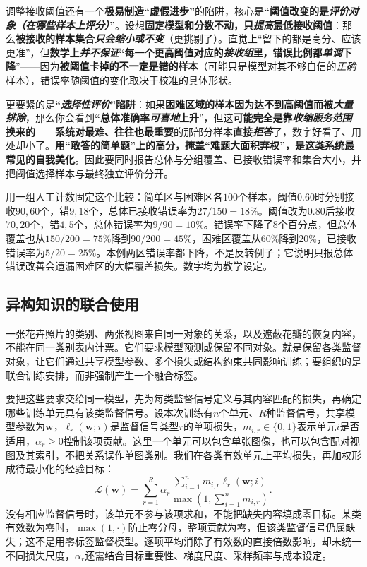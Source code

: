 调整接收阈值还有一个\textbf{极易制造“虚假进步”}的陷阱，核心是\textbf{“阈值改变的是\emph{评价对象（在哪些样本上评分）}”}。设想\textbf{固定模型和分数不动，只\emph{提高}最低接收阈值}：那么\textbf{被接收的样本集合\emph{只会缩小或不变}}（更挑剔了）。直觉上“留下的都是高分、应该更准”，但\textbf{数学上\emph{并不保证}“每一个更高阈值对应的\emph{接收组}里，错误比例都\emph{单调}下降}”——因为\textbf{被阈值卡掉的不一定是错的样本}（可能只是模型对其不够自信的\emph{正确}样本），错误率随阈值的变化取决于校准的具体形状。

更要紧的是\textbf{“\emph{选择性评价}”陷阱}：如果\textbf{困难区域的样本因为达不到高阈值而被\emph{大量排除}}，那么你会看到\textbf{“总体准确率\emph{可喜地}上升}”，但这\textbf{可能完全是靠\emph{收缩服务范围}换来的}——\textbf{系统对最难、往往也最重要}的那部分样本\textbf{直接\emph{拒答}}了，数字好看了、用处却小了。\textbf{用“敢答的简单题”上的高分，掩盖“难题大面积弃权”，是这类系统最常见的自我美化}。因此要同时报告总体与分组覆盖、已接收错误率和集合大小，并把阈值选择样本与最终独立评价分开。

用一组人工计数固定这个比较：简单区与困难区各$100$个样本，阈值$0.60$时分别接收$90,60$个，错$9,18$个，总体已接收错误率为$27/150=18\%$。阈值改为$0.80$后接收$70,20$个，错$4,5$个，总体错误率为$9/90=10\%$。错误率下降了$8$个百分点，但总体覆盖也从$150/200=75\%$降到$90/200=45\%$，困难区覆盖从$60\%$降到$20\%$，已接收错误率为$5/20=25\%$。本例两区错误率都下降，不是反转例子；它说明只报总体错误改善会遗漏困难区的大幅覆盖损失。数字均为教学设定。

\subsection{异构知识的联合使用}
\label{sec:knowledge-fusion-heterogeneous-use}

一张花卉照片的类别、两张视图来自同一对象的关系，以及遮蔽花瓣的恢复内容，不能在同一类别表内计票。它们要求模型预测或保留不同对象。就是保留各类监督对象，让它们通过共享模型参数、多个损失或结构约束共同影响训练；要组织的是联合训练安排，而非强制产生一个融合标签。

要把这些要求交给同一模型，先为每类监督信号定义与其内容匹配的损失，再确定哪些训练单元具有该类监督信号。设本次训练有$n$个单元、$R$种监督信号，共享模型参数为$\bm{w}$，$\ell_r(\bm{w};i)$是监督信号类型$r$的单项损失，$m_{i,r}\in\{0,1\}$表示单元$i$是否适用，$\alpha_r\geq0$控制该项贡献。这里一个单元可以包含单张图像，也可以包含配对视图及其索引，不把关系误作单图类别。我们在各类有效单元上平均损失，再加权形成待最小化的经验目标：
\begin{equation}
  \mathcal{L}(\bm{w})
  =
  \sum_{r=1}^{R}
  \alpha_r
  \frac{\sum_{i=1}^{n}m_{i,r}\ell_r(\bm{w};i)}
  {\max\left(1,\sum_{i=1}^{n}m_{i,r}\right)}.
  \label{eq:knowledge-fusion-heterogeneous-objective}
\end{equation}
没有相应监督信号时，该单元不参与该项求和，不能把缺失内容填成零目标。某类有效数为零时，$\max(1,\cdot)$防止零分母，整项贡献为零，但该类监督信号仍属缺失；这不是用零标签监督模型。逐项平均消除了有效数的直接倍数影响，却未统一不同损失尺度，$\alpha_r$还需结合目标重要性、梯度尺度、采样频率与成本设定。


